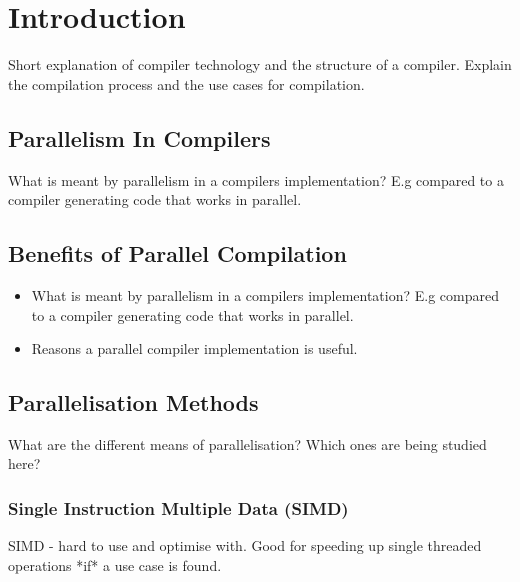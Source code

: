 \section{Introduction}
\begin{sectionplan}
     Short explanation of compiler technology and the structure of a compiler.
Explain the compilation process and the use cases for compilation.
\end{sectionplan}

\citep{li_associative_2023}

\subsection{Parallelism In Compilers}
\begin{sectionplan}
     What is meant by parallelism in a compilers implementation? E.g compared to
a compiler generating code that works in parallel.
\end{sectionplan}

\subsection{Benefits of Parallel Compilation}
\begin{sectionplan}
     \begin{itemize}
          \item What is meant by parallelism in a compilers implementation? E.g
                compared to a compiler generating code that works in parallel.
          \item Reasons a parallel compiler implementation is useful.
     \end{itemize}
\end{sectionplan}
\subsection{Parallelisation Methods}
\begin{sectionplan}
     What are the different means of parallelisation? Which ones are being
studied here?
\end{sectionplan}

\subsubsection{Single Instruction Multiple Data (SIMD)}
\begin{sectionplan}
SIMD - hard to use and optimise with. Good for speeding up single threaded
operations *if* a use case is found.
\end{sectionplan}
